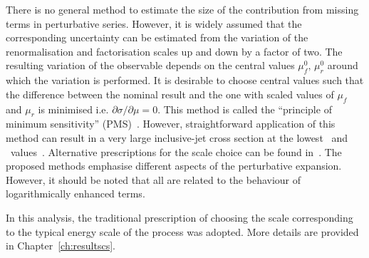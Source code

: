 There is no general method to estimate the size of the contribution from missing terms in perturbative series. However, it is widely assumed that the corresponding uncertainty can be estimated from the variation of the renormalisation and factorisation scales up and down by a factor of two. The resulting variation of the observable depends on the central values $\mu_{f}^{0},\,\mu_{r}^{0}$ around which the variation is performed. It is desirable to choose central values such that the difference between the nominal result and the one with scaled values of $\mu_f$ and $\mu_r$ is minimised i.e. $\partial{\sigma}/\partial\mu=0$. This method is called the ``principle of minimum sensitivity'' (PMS)~\cite{Stevenson:1980du}. However, straightforward application of this method can result in a very large inclusive-jet cross section at the lowest \qsq~and \etjet~values~\cite{thesis:britzger:2013}. Alternative prescriptions for the scale choice can be found in~\cite{Ioffe:2010zz}. The proposed methods emphasise different aspects of the perturbative expansion. However, it should be noted that all are related to the behaviour of logarithmically enhanced terms.

In this analysis, the traditional prescription of choosing the scale corresponding to the typical energy scale of the process was adopted. More details are provided in Chapter~\ref{ch:resultscs}.
